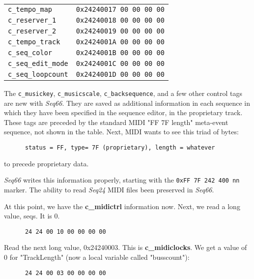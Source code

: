 \begin{table}[htb]
\begin{tabular}{l l}
         \texttt{c\_tempo\_map}     & \texttt{0x24240017 00 00 00 00} \\
         \texttt{c\_reserver\_1}    & \texttt{0x24240018 00 00 00 00} \\
         \texttt{c\_reserver\_2}    & \texttt{0x24240019 00 00 00 00} \\
         \texttt{c\_tempo\_track}   & \texttt{0x2424001A 00 00 00 00} \\
         \texttt{c\_seq\_color}     & \texttt{0x2424001B 00 00 00 00} \\
         \texttt{c\_seq\_edit\_mode} & \texttt{0x2424001C 00 00 00 00} \\
         \texttt{c\_seq\_loopcount} & \texttt{0x2424001D 00 00 00 00} \\
      \end{tabular}
   \end{table}

   The \texttt{c\_musickey},
   \texttt{c\_musicscale},
   \texttt{c\_backsequence}, and a few other
   control tags are new with \textsl{Seq66}.
   They are saved as additional information in each sequence in which they
   have been specified in the sequence editor, in the proprietary track.
   These tags are preceded by the standard MIDI "FF 7F length" meta-event
   sequence, not shown in the table.
   Next, MIDI wants to see this triad of bytes:

   \begin{verbatim}
      status = FF, type= 7F (proprietary), length = whatever
   \end{verbatim}

   to precede proprietary data.

   \textsl{Seq66} writes this information properly,
   starting with the \texttt{0xFF 7F 242 400 nn} marker.
   The ability to read \textsl{Seq24} MIDI files been preserved in
   \textsl{Seq66}.

   At this point, we have the \textbf{c\_midictrl} information now.
   Next, we read a long value, seqs.  It is 0.

   \begin{verbatim}
      24 24 00 10 00 00 00 00
   \end{verbatim}

   Read the next long value, 0x24240003.  This is \textbf{c\_midiclocks}.
   We get a value of 0 for "TrackLength" (now a local variable called
   "busscount"):

   \begin{verbatim}
      24 24 00 03 00 00 00 00
   \end{verbatim}

